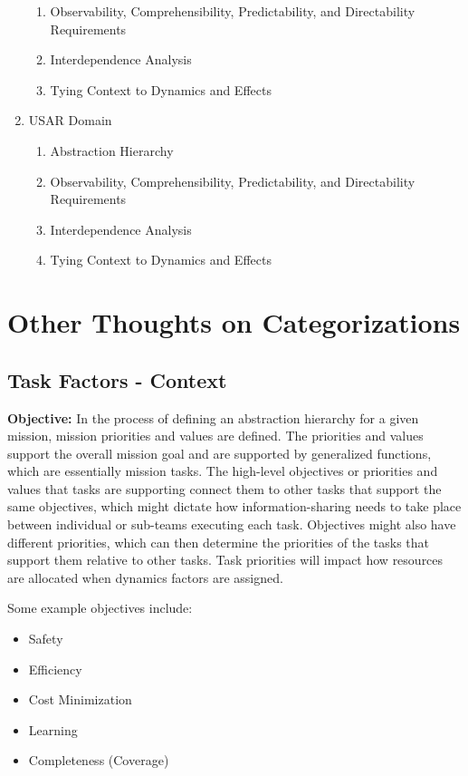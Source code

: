 \documentclass[letterpaper, 10 pt, conference]{ieeeconf}  %
\theoremstyle{definition}
\begin{document}
\begin{enumerate}
\begin{enumerate}
    \item Observability, Comprehensibility, Predictability, and Directability Requirements
    \item Interdependence Analysis
    \item Tying Context to Dynamics and Effects
\end{enumerate}

\item USAR Domain

\begin{enumerate}
    \item Abstraction Hierarchy
    \item Observability, Comprehensibility, Predictability, and Directability Requirements
    \item Interdependence Analysis
    \item Tying Context to Dynamics and Effects
\end{enumerate}

\end{enumerate}

\newpage

\section{Other Thoughts on Categorizations}
\subsection{Task Factors - Context}
\textbf{Objective:} In the process of defining an abstraction hierarchy for a given mission, mission priorities and values are defined. The priorities and values support the overall mission goal and are supported by generalized functions, which are essentially mission tasks. The high-level objectives or priorities and values that tasks are supporting connect them to other tasks that support the same objectives, which might dictate how information-sharing needs to take place between individual or sub-teams executing each task. Objectives might also have different priorities, which can then determine the priorities of the tasks that support them relative to other tasks. Task priorities will impact how resources are allocated when dynamics factors are assigned. 

Some example objectives include:
\begin{itemize}
    \item Safety
    \item Efficiency
    \item Cost Minimization
    \item Learning
    \item Completeness (Coverage)
\end{itemize}
\end{document}
